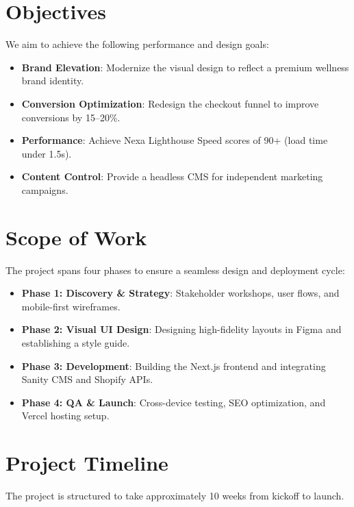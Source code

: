 \documentclass[11pt, letterpaper]{article}
\begin{document}
\section{Objectives}
We aim to achieve the following performance and design goals:
\begin{itemize}
    \item \textbf{Brand Elevation}: Modernize the visual design to reflect a premium wellness brand identity.
    \item \textbf{Conversion Optimization}: Redesign the checkout funnel to improve conversions by 15--20\%.
    \item \textbf{Performance}: Achieve Nexa Lighthouse Speed scores of 90+ (load time under 1.5s).
    \item \textbf{Content Control}: Provide a headless CMS for independent marketing campaigns.
\end{itemize}

\vspace{0.05in}

\section{Scope of Work}
The project spans four phases to ensure a seamless design and deployment cycle:
\begin{itemize}
    \item \textbf{Phase 1: Discovery \& Strategy}: Stakeholder workshops, user flows, and mobile-first wireframes.
    \item \textbf{Phase 2: Visual UI Design}: Designing high-fidelity layouts in Figma and establishing a style guide.
    \item \textbf{Phase 3: Development}: Building the Next.js frontend and integrating Sanity CMS and Shopify APIs.
    \item \textbf{Phase 4: QA \& Launch}: Cross-device testing, SEO optimization, and Vercel hosting setup.
\end{itemize}

\newpage %

\section{Project Timeline}
The project is structured to take approximately 10 weeks from kickoff to launch.
\end{document}
